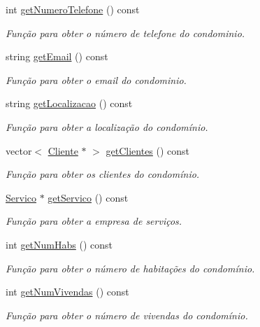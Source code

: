 \begin{DoxyCompactItemize}
int \hyperlink{class_condominio_adc7a4de5ad8ace80c0290fff0619f22d}{get\+Numero\+Telefone} () const 
\begin{DoxyCompactList}\small\item\em Função para obter o número de telefone do condominio. \end{DoxyCompactList}\item 
string \hyperlink{class_condominio_adc4a6fa8a9fcb43a65226b722b7929d0}{get\+Email} () const 
\begin{DoxyCompactList}\small\item\em Função para obter o email do condominio. \end{DoxyCompactList}\item 
string \hyperlink{class_condominio_a9404521b87cc71622544fe8ecc9c28fb}{get\+Localizacao} () const 
\begin{DoxyCompactList}\small\item\em Função para obter a localização do condomínio. \end{DoxyCompactList}\item 
vector$<$ \hyperlink{class_cliente}{Cliente} $\ast$ $>$ \hyperlink{class_condominio_a6a9100e8a8a48847785f4c4b108ab8db}{get\+Clientes} () const 
\begin{DoxyCompactList}\small\item\em Função para obter os clientes do condomínio. \end{DoxyCompactList}\item 
\hyperlink{class_servico}{Servico} $\ast$ \hyperlink{class_condominio_abb987c983caf8468935773b00505a5e2}{get\+Servico} () const 
\begin{DoxyCompactList}\small\item\em Função para obter a empresa de serviços. \end{DoxyCompactList}\item 
int \hyperlink{class_condominio_a81756f3ac4301c65deade4c520ea6ae1}{get\+Num\+Habs} () const 
\begin{DoxyCompactList}\small\item\em Função para obter o número de habitações do condomínio. \end{DoxyCompactList}\item 
int \hyperlink{class_condominio_a47e2e368a9e643017cad7a2e30a4c087}{get\+Num\+Vivendas} () const 
\begin{DoxyCompactList}\small\item\em Função para obter o número de vivendas do condomínio. \end{DoxyCompactList}\item 

\end{DoxyCompactItemize}
